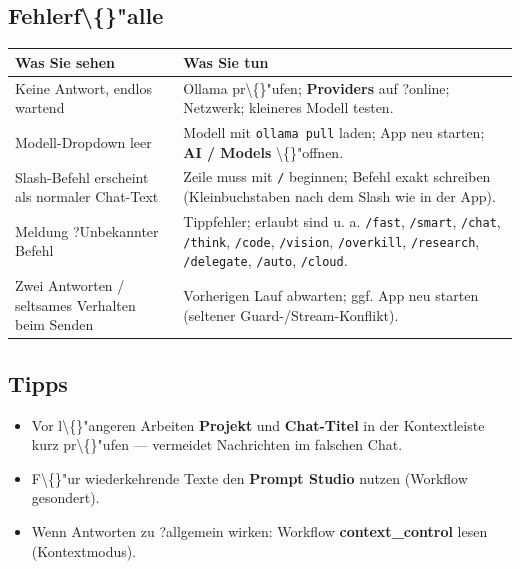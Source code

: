 \subsection{Fehlerf\textbackslash\{\}"alle}

\begin{center}
\begin{tabular}{ll}
\hline
Was Sie sehen & Was Sie tun \\
\hline
Keine Antwort, endlos wartend & Ollama pr\textbackslash\{\}"ufen; \textbf{Providers} auf ?online\texttt{}; Netzwerk; kleineres Modell testen. \\
Modell-Dropdown leer & Modell mit \texttt{ollama pull} laden; App neu starten; \textbf{AI / Models} \textbackslash\{\}"offnen. \\
Slash-Befehl erscheint als normaler Chat-Text & Zeile muss mit \texttt{/} beginnen; Befehl exakt schreiben (Kleinbuchstaben nach dem Slash wie in der App). \\
Meldung ?Unbekannter Befehl\texttt{} & Tippfehler; erlaubt sind u. a. \texttt{/fast}, \texttt{/smart}, \texttt{/chat}, \texttt{/think}, \texttt{/code}, \texttt{/vision}, \texttt{/overkill}, \texttt{/research}, \texttt{/delegate}, \texttt{/auto}, \texttt{/cloud}. \\
Zwei Antworten / seltsames Verhalten beim Senden & Vorherigen Lauf abwarten; ggf. App neu starten (seltener Guard-/Stream-Konflikt). \\
\hline
\end{tabular}
\end{center}

\subsection{Tipps}

\begin{itemize}
\item Vor l\textbackslash\{\}"angeren Arbeiten \textbf{Projekt} und \textbf{Chat-Titel} in der Kontextleiste kurz pr\textbackslash\{\}"ufen --- vermeidet Nachrichten im falschen Chat.
\item F\textbackslash\{\}"ur wiederkehrende Texte den \textbf{Prompt Studio} nutzen (Workflow gesondert).
\item Wenn Antworten zu ?allgemein\texttt{} wirken: Workflow \textbf{context\_control} lesen (Kontextmodus).
\end{itemize}

